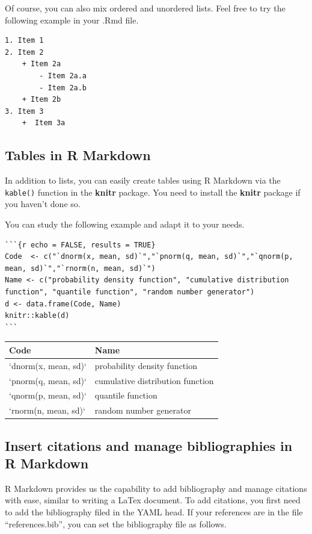 \documentclass[
]{book}
\begin{document}
Of course, you can also mix ordered and unordered lists. Feel free to try the following example in your .Rmd file.

\begin{verbatim}
1. Item 1
2. Item 2
    + Item 2a
        - Item 2a.a
        - Item 2a.b
    + Item 2b
3. Item 3
    +  Item 3a
\end{verbatim}

\hypertarget{tables-in-r-markdown}{%
\subsection{Tables in R Markdown}\label{tables-in-r-markdown}}

In addition to lists, you can easily create tables using R Markdown via the \texttt{kable()} function in the \textbf{knitr} package. You need to install the \textbf{knitr} package if you haven't done so.

You can study the following example and adapt it to your needs.

\begin{verbatim}
```{r echo = FALSE, results = TRUE}
Code  <- c("`dnorm(x, mean, sd)`","`pnorm(q, mean, sd)`","`qnorm(p, mean, sd)`","`rnorm(n, mean, sd)`")
Name <- c("probability density function", "cumulative distribution function", "quantile function", "random number generator")
d <- data.frame(Code, Name)
knitr::kable(d)
```
\end{verbatim}

\begin{tabular}{l|l}
\hline
Code & Name\\
\hline
`dnorm(x, mean, sd)` & probability density function\\
\hline
`pnorm(q, mean, sd)` & cumulative distribution function\\
\hline
`qnorm(p, mean, sd)` & quantile function\\
\hline
`rnorm(n, mean, sd)` & random number generator\\
\hline
\end{tabular}

\hypertarget{insert-citations-and-manage-bibliographies-in-r-markdown}{%
\subsection{Insert citations and manage bibliographies in R Markdown}\label{insert-citations-and-manage-bibliographies-in-r-markdown}}

R Markdown provides us the capability to add bibliography and manage citations with ease, similar to writing a LaTex document. To add citations, you first need to add the bibliography filed in the YAML head. If your references are in the file ``references.bib'', you can set the bibliography file as follows.
\end{document}
